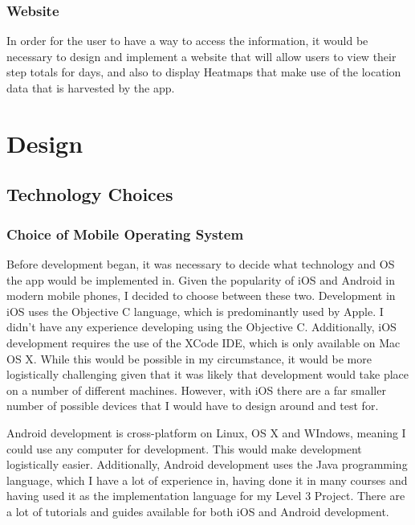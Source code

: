 \documentclass{l4proj}
\begin{document}
\subsection{Website}

In order for the user to have a way to access the information, it would be necessary to design and implement a website that will allow users to view their step totals for days, and also to display Heatmaps that make use of the location data that is harvested by the app.


\chapter{Design}

\section{Technology Choices}

\subsection{Choice of Mobile Operating System}

Before development began, it was necessary to decide what technology and OS the app would be implemented in. Given the popularity of iOS and Android in modern mobile phones, I decided to choose between these two. Development in iOS uses the Objective C language, which is predominantly used by Apple. I didn’t have any experience developing using the Objective C. Additionally, iOS development requires the use of the XCode IDE, which is only available on Mac OS X.  While this would be possible in my circumstance, it would be more logistically challenging given that it was likely that development would take place on a number of different machines. However, with iOS there are a far smaller number of possible devices that I would have to design around and test for.

Android development is cross-platform on Linux, OS X and WIndows, meaning I could use any computer for development. This would make development logistically easier. Additionally, Android development uses the Java programming language, which I have a lot of experience in, having done it in many courses and having used it as the implementation language for my Level 3 Project. There are a lot of tutorials and guides available for both iOS and Android development.
\end{document}
